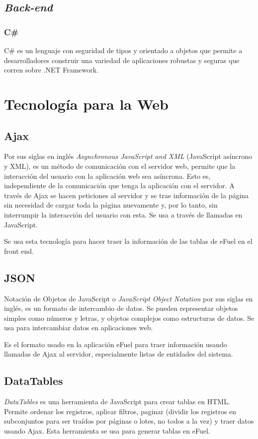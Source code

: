 \subsection{\emph{Back-end}}
\subsubsection{C\#}
C\# \cite{cSharpMicrosoft} es un lenguaje con seguridad de tipos y orientado a objetos que permite a desarrolladores construir una variedad de aplicaciones robustas y seguras que corren sobre .NET Framework.

\section{Tecnología para la Web}
\subsection{Ajax}
Por sus siglas en inglés \emph{Asynchronous JavaScript and XML} \cite{ajaxGarrett} (JavaScript asíncrono y XML), es un método de comunicación con el servidor web, permite que la interacción del usuario con la aplicación web sea asíncrona. Esto es, independiente de la comunicación que tenga la aplicación con el servidor. A través de Ajax se hacen peticiones al servidor y se trae información de la página sin necesidad de cargar toda la página nuevamente y, por lo tanto, sin interrumpir la interacción del usuario con esta. Se usa a través de llamadas en JavaScript.

Se usa esta tecnología para hacer traer la información de las tablas de eFuel en el front end.

\subsection{JSON}
Notación de Objetos de JavaScript o \emph{JavaScript Object Notation} \cite{jsonMozilla} por sus siglas en inglés, es un formato de intercambio de datos. Se pueden representar objetos simples como números y letras, y objetos complejos como estructuras de datos. Se usa para intercambiar datos en aplicaciones web.

Es el formato usado en la aplicación eFuel para traer información usando llamadas de Ajax al servidor, especialmente listas de entidades del sistema.

\subsection{DataTables}
\emph{DataTables} \cite{datatablesManual} es una herramienta de JavaScript para crear tablas en HTML. Permite ordenar los registros, aplicar filtros, paginar (dividir los registros en subconjuntos para ser traídos por páginas o lotes, no todos a la vez) y traer datos usando Ajax. Esta herramienta se usa para generar tablas en eFuel.

